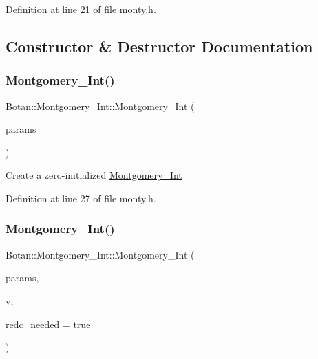 Definition at line 21 of file monty.\+h.



\subsection{Constructor \& Destructor Documentation}
\mbox{\label{class_botan_1_1_montgomery___int_a129cc27370aacbb8cc3f56c75239efce}} 
\subsubsection{\texorpdfstring{Montgomery\+\_\+\+Int()}{Montgomery\_Int()}\hspace{0.1cm}{\footnotesize\ttfamily [1/4]}}
{\footnotesize\ttfamily Botan\+::\+Montgomery\+\_\+\+Int\+::\+Montgomery\+\_\+\+Int (\begin{DoxyParamCaption}\item[{std\+::shared\+\_\+ptr$<$ const \mbox{\hyperlink{class_botan_1_1_montgomery___params}{Montgomery\+\_\+\+Params}} $>$}]{params }\end{DoxyParamCaption})\hspace{0.3cm}{\ttfamily [inline]}}

Create a zero-\/initialized \mbox{\hyperlink{class_botan_1_1_montgomery___int}{Montgomery\+\_\+\+Int}} 

Definition at line 27 of file monty.\+h.

\mbox{\label{class_botan_1_1_montgomery___int_acc0e9d1c3a33343a1f70f1850a12160f}} 
\subsubsection{\texorpdfstring{Montgomery\+\_\+\+Int()}{Montgomery\_Int()}\hspace{0.1cm}{\footnotesize\ttfamily [2/4]}}
{\footnotesize\ttfamily Botan\+::\+Montgomery\+\_\+\+Int\+::\+Montgomery\+\_\+\+Int (\begin{DoxyParamCaption}\item[{std\+::shared\+\_\+ptr$<$ const \mbox{\hyperlink{class_botan_1_1_montgomery___params}{Montgomery\+\_\+\+Params}} $>$}]{params,  }\item[{const Big\+Int \&}]{v,  }\item[{bool}]{redc\+\_\+needed = {\ttfamily true} }\end{DoxyParamCaption})}

